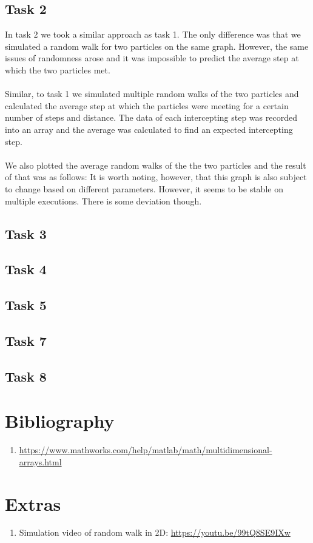 \documentclass{article}
\begin{document}
\subsection{Task 2}
In task 2 we took a similar approach as task 1. The only difference was that we simulated a random walk 
for two particles on the same graph. However, the same issues of randomness arose and it was impossible to
predict the average step at which the two particles met. 
\\\\
Similar, to task 1 we simulated multiple random walks of the two particles and calculated the average step 
at which the particles were meeting for a certain number of steps and distance. The data of each intercepting 
step was recorded into an array and the average was calculated to find an expected intercepting step.
\\\\
We also plotted the average random walks of the the two particles and the result of that was as follows:
It is worth noting, however, that this graph is also subject to change based on different parameters. However, 
it seems to be stable on multiple executions. There is some deviation though. 
\subsection{Task 3}
\subsection{Task 4}
\subsection{Task 5}
\subsection{Task 7}
\subsection{Task 8}
\section{Bibliography}

\begin{enumerate}
    \item \url{https://www.mathworks.com/help/matlab/math/multidimensional-arrays.html}
\end{enumerate}

\section{Extras}
\begin{enumerate}
    \item Simulation video of random walk in 2D: \url{https://youtu.be/99tQ8SE9IXw}
\end{enumerate}
\end{document}
